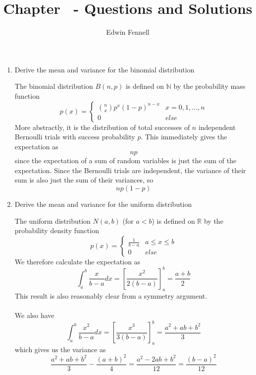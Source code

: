 \documentclass{article}
\title{Chapter \chapternumber\ - Questions and Solutions}
\author{Edwin Fennell}
\date{}
\newcommand{\chapternumber}{2}
\newenvironment{QandA}{\begin{enumerate}[label=\chapternumber.\arabic*]\bfseries\boldmath}
	{\end{enumerate}}
\newenvironment{answered}{\par\bigskip\normalfont\unboldmath}{}
\begin{document}
	
	\maketitle
	
	\noindent%
	\begin{QandA}
		\item Derive the mean and variance for the binomial distribution
		\begin{answered}
			The binomial distribution $B(n,p)$ is defined on $\mathbb{N}$ by the probability mass function
			\[p(x)=
			\begin{cases}
			\binom{n}{x}p^x(1-p)^{n-x} & x = 0,1,...,n\\
			0 & else
			\end{cases}\]
			More abstractly, it is the distribution of total successes of $n$ independent Bernoulli trials with success probability $p$. This immediately gives the expectation as
			\[np\]
			since the expectation of a sum of random variables is just the sum of the expectation. Since the Bernoulli trials are independent, the variance of their sum is also just the sum of their variances, so
			\[np(1-p)\]
		\end{answered}
	
	
		\item Derive the mean and variance for the uniform distribution
		\begin{answered}
			The uniform distribution $N(a,b)$ (for $a<b$) is defined on $\mathbb{R}$ by the probability density function
			\[p(x)=
			\begin{cases}
			\frac{1}{b-a} & a\leq x\leq b\\
			0 & else
			\end{cases}
			\]
			We therefore calculate the expectation as
			\[\int_{a}^{b}\frac{x}{b-a}dx=
			\left[\frac{x^2}{2(b-a)}\right]_{a}^{b}=\frac{a+b}{2}\]
			This result is also reasonably clear from a symmetry argument.\\
			\\
			We also have
			\[\int_{a}^{b}\frac{x^2}{b-a}dx=
			\left[\frac{x^3}{3(b-a)}\right]_{a}^{b}=\frac{a^2+ab+b^2}{3}\]
			which gives us the variance as
			\[\frac{a^2+ab+b^2}{3}-\frac{(a+b)^2}{4}=\frac{a^2-2ab+b^2}{12}=\frac{(b-a)^2}{12}\]		\end{answered}
		

\end{QandA}
\end{document}
